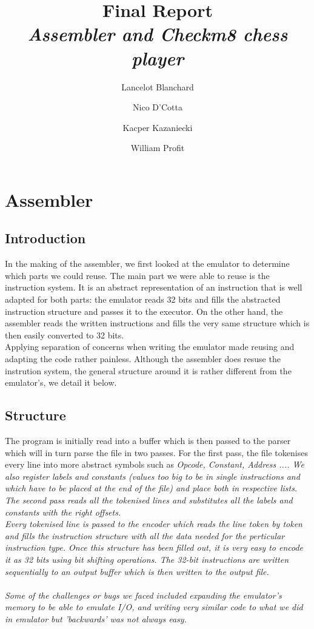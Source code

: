 \documentclass[11pt]{article}
\begin{document}
\title{Final Report\\
  \small{\em{Assembler and Checkm8 chess player}}}
\author{Lancelot Blanchard \and Nico D'Cotta \and Kacper Kazaniecki \and William Profit}

\maketitle

\section{Assembler}

\subsection{Introduction}

In the making of the assembler, we first looked at the emulator to determine
which parts we could reuse. The main part we were able to reuse is the
instruction system. It is an abstract representation of an instruction that is
well adapted for both parts: the emulator reads 32 bits and fills the abstracted
instruction structure and passes it to the executor. On the other hand, the
assembler reads the written instructions and fills the very same structure which
is then easily converted to 32 bits. \\ Applying separation of concerns when writing
the emulator made reusing and adapting the code rather painless. 
Although the assembler does resuse the
instrution system, the general structure around it is rather different from the emulator's, we
detail it below.

\subsection{Structure}

The program is initially read into a buffer which is then passed to the parser
which will in turn parse the file in two passes. For the first pass, the file
tokenises every line into more abstract symbols such as \em Opcode, Constant,
Address ...\em. We also register labels and constants (values too big to be in
single instructions and which have to be placed at the end of the file) and
place both in respective lists. The second pass reads all the tokenised lines
and substitutes all the labels and constants with the right offsets.\\

Every tokenised line is passed to the encoder which reads the line token by
token and fills the instruction structure with all the data needed for the
perticular instruction type. Once this structure has been filled out, it is very
easy to encode it as 32 bits using bit shifting operations. The 32-bit
instructions are written sequentially to an output buffer which is then written
to the output file. \\ \\
Some of the challenges or bugs we faced included expanding the emulator's 
memory to be able to emulate I/O, and writing very similar code to what we did
in emulator but 'backwards' was not always easy.
\end{document}
